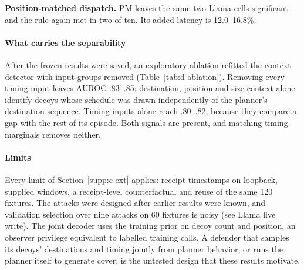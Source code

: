 \textbf{Position-matched dispatch.} PM leaves the same two Llama cells significant and the rule again met in two of ten. Its added latency is 12.0--16.8\%.



\paragraph{What carries the separability}
After the frozen results were saved, an exploratory ablation refitted the context detector with input groups removed (Table~\ref{tab:d-ablation}). Removing every timing input leaves AUROC .83--.85: destination, position and size context alone identify decoys whose schedule was drawn independently of the planner's destination sequence. Timing inputs alone reach .80--.82, because they compare a gap with the rest of its episode. Both signals are present, and matching timing marginals removes neither.

\paragraph{Limits}
Every limit of Section~\ref{supp:c-ext} applies: receipt timestamps on loopback, supplied windows, a receipt-level counterfactual and reuse of the same 120 fixtures. The attacks were designed after earlier results were known, and validation selection over nine attacks on 60 fixtures is noisy (see Llama live write). The joint decoder uses the training prior on decoy count and position, an observer privilege equivalent to labelled training calls. A defender that samples its decoys' destinations and timing jointly from planner behavior, or runs the planner itself to generate cover, is the untested design that these results motivate.
